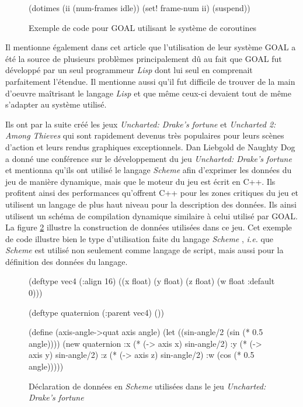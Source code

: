 \documentclass[12pt,twoside,letterpaper,francais]{book}
\newcommand{\ie}{{\textit{i.e. }}}
\newcommand{\lisp}{{\textit{Lisp }}}
\newcommand{\Schemelang}{{\textit{Scheme }}}
\begin{document}
\begin{figure}[htb!]
  \begin{schemecode}
(dotimes (ii (num-frames idle))
  (set! frame-num ii)
  (suspend))
  \end{schemecode}
  \caption{Exemple de code pour GOAL utilisant le système de coroutines}
  \label{Rev:goal}
\end{figure}

Il mentionne également dans cet article que l'utilisation de leur
système GOAL a été la source de plusieurs problèmes principalement dû
au fait que GOAL fut développé par un seul programmeur \lisp dont lui
seul en comprenait parfaitement l'étendue. Il mentionne aussi qu'il
fut difficile de trouver de la main d'oeuvre maîtrisant le langage
\lisp et que même ceux-ci devaient tout de même s'adapter au système
utilisé.

Ils ont par la suite créé les jeux \textit{Uncharted: Drake's fortune}
et \textit{Uncharted 2: Among Thieves} qui sont rapidement devenus
très populaires pour leurs scènes d'action et leurs rendus graphiques
exceptionnels. Dan Liebgold de Naughty Dog a donné une conférence sur
le développement du jeu \textit{Uncharted: Drake's
  fortune}~\cite{ND_DRAKE} et mentionna qu'ils ont utilisé le langage
\Schemelang afin d'exprimer les données du jeu de manière dynamique,
mais que le moteur du jeu est écrit en C++. Ils profitent ainsi des
performances qu'offrent C++ pour les zones critiques du jeu et
utilisent un langage de plus haut niveau pour la description des
données. Ils ainsi utilisent un schéma de compilation dynamique
similaire à celui utilisé par GOAL. La figure \ref{Rev:Drake} illustre
la construction de données utilisées dans ce jeu. Cet exemple de code
illustre bien le type d'utilisation faite du langage \Schemelang, \ie
que \Schemelang est utilisé non seulement comme langage de script,
mais aussi pour la définition des données du langage.\\

\begin{figure}[htb!]
  \begin{schemecode}
(deftype vec4 (:align 16)
  ((x float) (y float)
   (z float) (w float :default 0)))

(deftype quaternion (:parent vec4) ())

(define (axis-angle->quat axis angle)
 (let ((sin-angle/2 (sin (* 0.5 angle))))
  (new quaternion
       :x (* (-> axis x) sin-angle/2)
       :y (* (-> axis y) sin-angle/2)
       :z (* (-> axis z) sin-angle/2)
       :w (cos (* 0.5 angle)))))
  \end{schemecode}
  \caption{Déclaration de données en \Schemelang utilisées dans le jeu
    \textit{Uncharted: Drake's fortune}~\cite{ND_DRAKE}}
  \label{Rev:Drake}
\end{figure}
\end{document}
